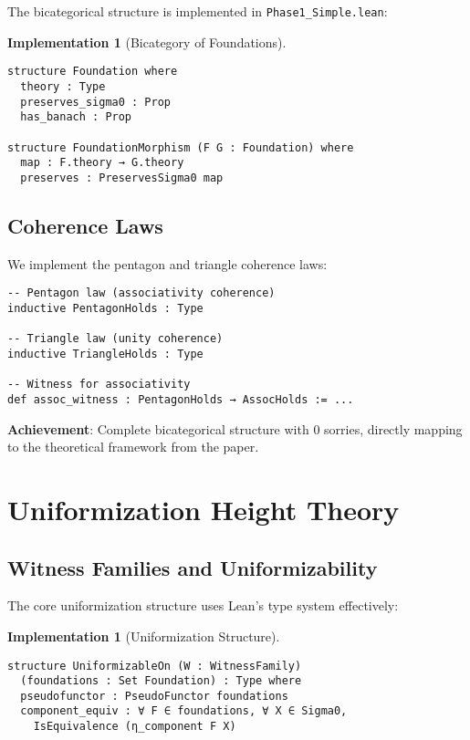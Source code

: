\documentclass[11pt]{article}
\theoremstyle{definition}
\newtheorem{implementation}[theorem]{Implementation}
\theoremstyle{remark}
\newcommand{\lean}[1]{\texttt{#1}}
\begin{document}
The bicategorical structure is implemented in \lean{Phase1\_Simple.lean}:

\begin{implementation}[Bicategory of Foundations]
\begin{lstlisting}[language={}]
structure Foundation where
  theory : Type
  preserves_sigma0 : Prop
  has_banach : Prop

structure FoundationMorphism (F G : Foundation) where
  map : F.theory → G.theory
  preserves : PreservesSigma0 map
\end{lstlisting}
\end{implementation}

\subsection{Coherence Laws}

We implement the pentagon and triangle coherence laws:

\begin{lstlisting}[language={}]
-- Pentagon law (associativity coherence)
inductive PentagonHolds : Type

-- Triangle law (unity coherence)  
inductive TriangleHolds : Type

-- Witness for associativity
def assoc_witness : PentagonHolds → AssocHolds := ...
\end{lstlisting}

\begin{mdframed}[style=achievement]
\textbf{Achievement}: Complete bicategorical structure with 0 sorries, directly mapping to the theoretical framework from the paper.
\end{mdframed}

\section{Uniformization Height Theory}

\subsection{Witness Families and Uniformizability}

The core uniformization structure uses Lean's type system effectively:

\begin{implementation}[Uniformization Structure]
\begin{lstlisting}[language={}]
structure UniformizableOn (W : WitnessFamily) 
  (foundations : Set Foundation) : Type where
  pseudofunctor : PseudoFunctor foundations
  component_equiv : ∀ F ∈ foundations, ∀ X ∈ Sigma0,
    IsEquivalence (η_component F X)
\end{lstlisting}
\end{implementation}
\end{document}
